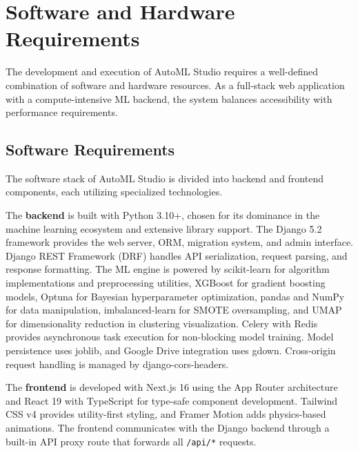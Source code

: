 \documentclass[12pt,a4paper]{report}
\begin{document}
\setcounter{chapter}{3}
\clearpage
\thispagestyle{empty}

\noindent
{}

\clearpage
{}
\setcounter{section}{0}
\section{Software and Hardware Requirements}

The development and execution of AutoML Studio requires a well-defined combination of software and hardware resources. As a full-stack web application with a compute-intensive ML backend, the system balances accessibility with performance requirements.

\subsection{Software Requirements}

The software stack of AutoML Studio is divided into backend and frontend components, each utilizing specialized technologies.

The \textbf{backend} is built with Python 3.10+, chosen for its dominance in the machine learning ecosystem and extensive library support. The Django 5.2 framework provides the web server, ORM, migration system, and admin interface. Django REST Framework (DRF) handles API serialization, request parsing, and response formatting. The ML engine is powered by scikit-learn for algorithm implementations and preprocessing utilities, XGBoost for gradient boosting models, Optuna for Bayesian hyperparameter optimization, pandas and NumPy for data manipulation, imbalanced-learn for SMOTE oversampling, and UMAP for dimensionality reduction in clustering visualization. Celery with Redis provides asynchronous task execution for non-blocking model training. Model persistence uses joblib, and Google Drive integration uses gdown. Cross-origin request handling is managed by django-cors-headers.

The \textbf{frontend} is developed with Next.js 16 using the App Router architecture and React 19 with TypeScript for type-safe component development. Tailwind CSS v4 provides utility-first styling, and Framer Motion adds physics-based animations. The frontend communicates with the Django backend through a built-in API proxy route that forwards all \texttt{/api/*} requests.
\end{document}
